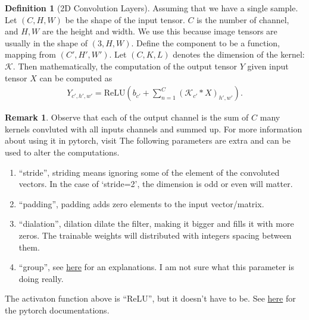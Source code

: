 \documentclass[]{article}
\theoremstyle{definition}
\newtheorem{definition}{Definition}
\newtheorem{remark}{Remark}[subsection]
{
    \newtheorem{assumption}{Assumption}
}
\numberwithin{equation}{subsection}
\begin{document}
        \begin{definition}[2D Convolution Layers]
            Assuming that we have a single sample. 
            Let $(C, H, W)$ be the shape of the input tensor. 
            $C$ is the number of channel, and $H, W$ are the height and width. 
            We use this because image tensors are usually in the shape of $(3, H, W)$. 
            Define the component to be a function, mapping from $(C', H', W')$. 
            Let $(C, K, L)$ denotes the dimension of the kernel: $\mathcal K$. 
            Then mathematically, the computation of the output tensor $Y$ given input tensor $X$ can be computed as
            $$
            \begin{aligned}
                Y_{c', h', w'} = 
                \text{ReLU}\left( b_{c'} + 
                \sum_{n = 1}^{C} (\mathcal K_{c'} * X)_{h', w'}\right). 
            \end{aligned}
            $$
        \end{definition}
        \begin{remark}
            Observe that each of the output channel is the sum of $C$ many kernels convluted with all inputs channels and summed up. 
            For more information about using it in pytorch, visit 
            The following parameters are extra and can be used to alter the computations. 
            \begin{enumerate}
                \item ``stride'', striding means ignoring some of the element of the convoluted vectors. In the case of `stride=2', the dimension is odd or even will matter. 
                
                \item ``padding'', padding adds zero elements to the input vector/matrix. 
                
                \item ``dialation'', dilation dilate the filter, making it bigger and fills it with more zeros. The trainable weights will distributed with integers spacing between them. 
                
                \item  ``group'', see \href{https://towardsdatascience.com/conv2d-to-finally-understand-what-happens-in-the-forward-pass-1bbaafb0b148}{here} for an explanations. I am not sure what this parameter is doing really.  
            \end{enumerate}
            The activaton function above is ``ReLU'', but it doesn't have to be. 
            See \href{https://pytorch.org/docs/stable/generated/torch.nn.Conv2d.html}{here} for the pytorch documentations. 
        \end{remark}
\end{document}
